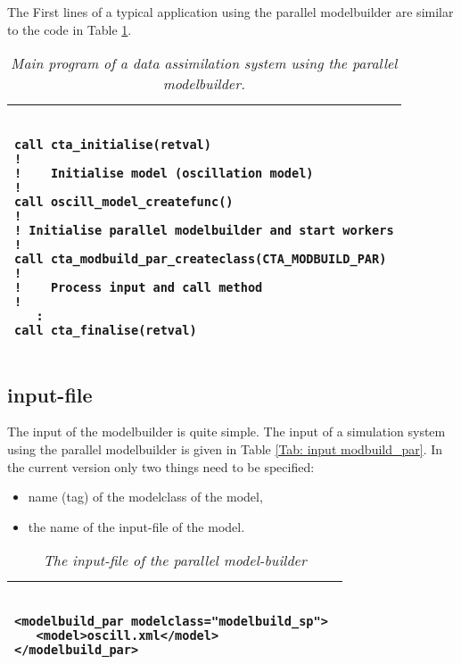 The First lines of a typical application using the parallel modelbuilder
are similar to the code in Table \ref{Tab: main program}.


\begin{table}[ht]
\begin{tabular}{|l|}
\hline
\begin{minipage}{16cm}
\begin{verbatim}

call cta_initialise(retval)
!
!    Initialise model (oscillation model)
!
call oscill_model_createfunc()
!
! Initialise parallel modelbuilder and start workers
!
call cta_modbuild_par_createclass(CTA_MODBUILD_PAR)
!
!    Process input and call method
!     
   :
call cta_finalise(retval)

\end{verbatim}
\end{minipage}
\\
\hline
\end{tabular}
\caption{\em Main program of a data assimilation system using the parallel
modelbuilder.}
\label{Tab: main program}
\end{table}


\subsection{input-file} \label{Sec:input-file}
The input of the modelbuilder is quite simple. The input of a simulation
system using the parallel modelbuilder is given in Table \ref{Tab: input
modbuild_par}. In the current version only two things need to
be specified:
\begin{itemize}
\item name (tag) of the modelclass of the model,
\item the name of the input-file of the model.
\end{itemize}


\begin{table}[h]
\begin{tabular}{|l|}
\hline
\begin{minipage}{16cm}
\begin{verbatim}

<modelbuild_par modelclass="modelbuild_sp"> 
   <model>oscill.xml</model>
</modelbuild_par> 

\end{verbatim}
\end{minipage}
\\
\hline
\end{tabular}
\caption{\em The input-file of the parallel model-builder}
\label{Tab: input modbuild_par}
\end{table}

